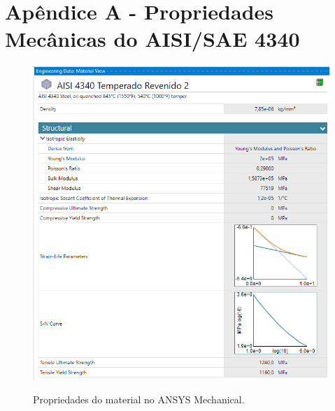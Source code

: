 
\titlespacing*{\chapter}{0pt}{-10pt}{-2cm} 
\captionsetup[figure]{list=no} %


\chapter*{Apêndice A - Propriedades Mecânicas do AISI/SAE 4340}
\label{apendiceA}

\begin{figure}[h]
   \centering
    \caption{Propriedades do material no ANSYS Mechanical.}
    \includegraphics[width=1.0\linewidth, trim = 0 0 0 0, clip]{Figuras/4340Ansys2.png}\\
    \hspace{1.5cm}\raggedright \fontsize{10}{12}\selectfont{Fonte: Elaborado pelo autor, 2025.}
    \label{4340Ansys}
\end{figure}



